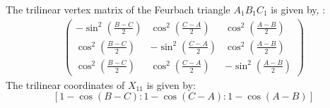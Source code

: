 The trilinear vertex matrix of the Feurbach triangle $A_1B_1C_1$ is given by, \cite[Feurbach triangle]{mw}:
\begin{align*}
  \left(\begin{matrix}-\sin^2(\frac{B-C}{2}) & \cos^2(\frac{C-A}{2})  & \cos^2(\frac{A-B}{2})\\ \cos^2(\frac{B-C}{2}) & -\sin^2(\frac{C-A}{2}) & \cos^2(\frac{A-B}{2})\\ \cos^2(\frac{B-C}{2}) & \cos^2(\frac{C-A}{2}) & -\sin^2(\frac{A-B}{2})\end{matrix}\right)
\end{align*}
The trilinear coordinates of $X_{11}$ is given by:
\[[ 1 - \cos(B - C) : 1 - \cos(C - A) : 1 - \cos(A - B)]\]